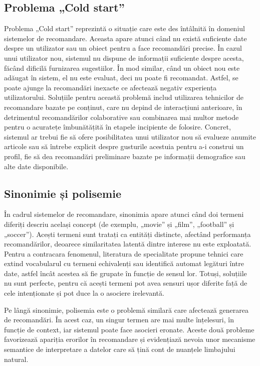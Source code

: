 \subsection{Problema „Cold start”}
\label{subsec:ch3sec4sub1}
Problema „Cold start”\cite{lika2014facing} reprezintă o situație care este des întâlnită în domeniul sistemelor de recomandare. 
Aceasta apare atunci când nu există suficiente date despre un utilizator sau un obiect pentru a face recomandări precise.
În cazul unui utilizator nou, sistemul nu dispune de informații suficiente despre acesta, făcând dificilă furnizarea sugestiilor.
În mod similar, când un obiect nou este adăugat în sistem, el nu este evaluat, deci nu poate fi recomandat.
Astfel, se poate ajunge la recomandări inexacte ce afectează negativ experiența utilizatorului.
Soluțiile pentru această problemă includ utilizarea tehnicilor de recomandare bazate pe conținut, care nu depind de interacțiuni anterioare, 
în detrimentul recomandărilor colaborative sau combinarea mai multor metode pentru o acuratețe îmbunătățită în etapele incipiente de folosire.
Concret, sistemul ar trebui fie să ofere posibilitatea unui utilizator nou să evalueze anumite articole sau să întrebe explicit despre gusturile acestuia pentru a-i construi un profil, 
fie să dea recomandări preliminare bazate pe informații demografice sau alte date disponibile\cite{kumar2018recommendation}.


\subsection{Sinonimie și polisemie}
\label{subsec:ch3sec4sub2}
În cadrul sistemelor de recomandare, sinonimia apare atunci când doi termeni diferiți descriu același concept (de exemplu, „movie” și „film”, „football” și „soccer”).
Acești termeni sunt tratați ca entități distincte, afectând performanța recomandărilor, deoarece similaritatea latentă dintre interese nu este exploatată.
Pentru a contracara fenomenul, literatura de specialitate propune tehnici care extind vocabularul cu termeni echivalenți sau identifică automat legături între date, astfel încât acestea să fie grupate în funcție de sensul lor.
Totuși, soluțiile nu sunt perfecte, pentru că acești termeni pot avea sensuri ușor diferite față de cele intenționate și pot duce la o asociere irelevantă\cite{mansur2017review}.
\par
Pe lângă sinonimie, polisemia este o problemă similară care afectează generarea de recomandări. În acest caz, un singur termen are mai multe înțelesuri, în funcție de context, iar sistemul poate face asocieri eronate.
Aceste două probleme favorizează apariția erorilor în recomandare și evidențiază nevoia unor mecanisme semantice de interpretare a datelor care să țină cont de nuanțele limbajului natural\cite{lops2011content}.

